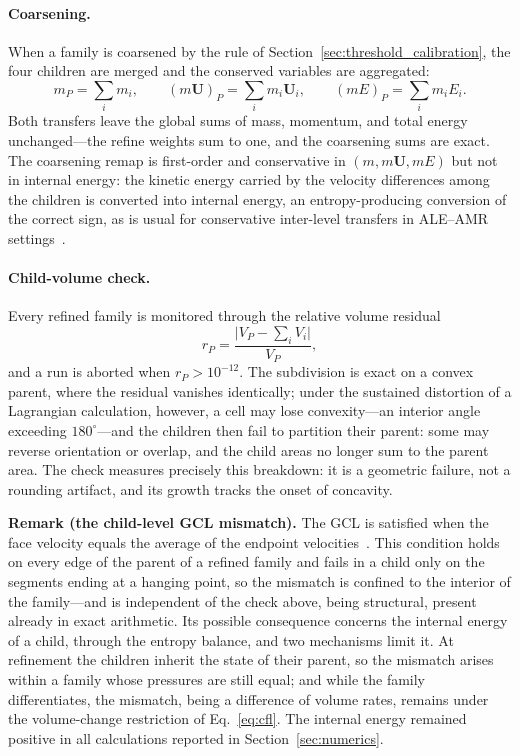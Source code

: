 \documentclass[a4paper]{cas-sc}
\begin{document}
\paragraph{Coarsening.}
When a family is coarsened by the rule of Section~\ref{sec:threshold_calibration}, the four children are merged and the conserved variables are aggregated:
\begin{equation}
	m_P=\sum_{i}m_i,\qquad
	(m\boldsymbol U)_P=\sum_i m_i\boldsymbol U_i,\qquad
	(mE)_P=\sum_i m_i E_i.
	\label{eq:coarsen_transfer}
\end{equation}
Both transfers leave the global sums of mass, momentum, and total energy unchanged---the refine weights sum to one, and the coarsening sums are exact. The coarsening remap is first-order and conservative in $(m,m\boldsymbol U,mE)$ but not in internal energy: the kinetic energy carried by the velocity differences among the children is converted into internal energy, an entropy-producing conversion of the correct sign, as is usual for conservative inter-level transfers in ALE--AMR settings~\cite{anderson2004arbitrary}.

\paragraph{Child-volume check.}
Every refined family is monitored through the relative volume residual
\begin{equation}
	r_P=\frac{\bigl|V_P-\sum_{i}V_i\bigr|}{V_P},
	\label{eq:volume_check}
\end{equation}
and a run is aborted when $r_P>10^{-12}$. The subdivision is exact on a convex parent, where the residual vanishes identically; under the sustained distortion of a Lagrangian calculation, however, a cell may lose convexity---an interior angle exceeding $180^\circ$---and the children then fail to partition their parent: some may reverse orientation or overlap, and the child areas no longer sum to the parent area. The check measures precisely this breakdown: it is a geometric failure, not a rounding artifact, and its growth tracks the onset of concavity.

\par\medskip\noindent\textbf{Remark (the child-level GCL mismatch).}
The GCL is satisfied when the face velocity equals the average of the endpoint velocities~\cite{maire2009high}. This condition holds on every edge of the parent of a refined family and fails in a child only on the segments ending at a hanging point, so the mismatch is confined to the interior of the family---and is independent of the check above, being structural, present already in exact arithmetic. Its possible consequence concerns the internal energy of a child, through the entropy balance, and two mechanisms limit it. At refinement the children inherit the state of their parent, so the mismatch arises within a family whose pressures are still equal; and while the family differentiates, the mismatch, being a difference of volume rates, remains under the volume-change restriction of Eq.~\eqref{eq:cfl}. The internal energy remained positive in all calculations reported in Section~\ref{sec:numerics}.
\end{document}
